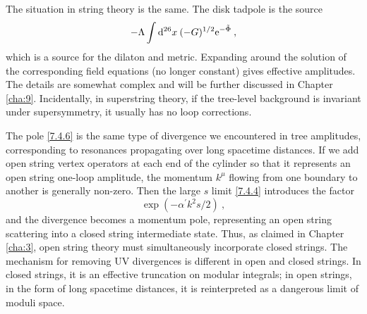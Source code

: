 The situation in string theory is the same. The disk tadpole is the source 
\begin{equation}
	-\Lambda \int \mathrm{d}^{26} x\: (-G)^{1 / 2} \mathrm{e}^{-\tilde{\Phi}} \:, \label{7.4.9} 
\end{equation}
which is a source for the dilaton and metric. Expanding around the solution of the corresponding field equations (no longer constant) gives effective amplitudes. 
The details are somewhat complex and will be further discussed in Chapter \ref{cha:9}. Incidentally, in superstring theory, if the tree-level background is invariant under supersymmetry, it usually has no loop corrections. 

The pole \eqref{7.4.6} is the same type of divergence we encountered in tree amplitudes, corresponding to resonances propagating over long spacetime distances. If we add open string vertex operators at each end of the cylinder so that it represents an open string one-loop amplitude, the momentum $k^{\mu}$ flowing from one boundary to another is generally non-zero. 
Then the large $s$ limit \eqref{7.4.4} introduces the factor 
\begin{equation}
	\exp (-\alpha^{\prime} k^{2} s / 2)\:, \label{7.4.10} 
\end{equation}
and the divergence becomes a momentum pole, representing an open string scattering into a closed string intermediate state. Thus, as claimed in Chapter \ref{cha:3}, open string theory must simultaneously incorporate closed strings. The mechanism for removing UV divergences is different in open and closed strings. In closed strings, it is an effective truncation on modular integrals; in open strings, in the form of long spacetime distances, it is reinterpreted as a dangerous limit of moduli space. 


